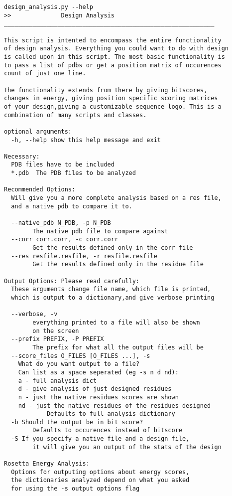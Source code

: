 \begin{lstlisting}[breaklines=true]
design_analysis.py --help
>>              Design Analysis
___________________________________________________________

This script is intented to encompass the entire functionality
of design analysis. Everything you could want to do with design
is called upon in this script. The most basic functionality is
to pass a list of pdbs or get a position matrix of occurences
count of just one line.

The functionality extends from there by giving bitscores,
changes in energy, giving position specific scoring matrices
of your design,giving a customizable sequence logo. This is a
combination of many scripts and classes.

optional arguments:
  -h, --help show this help message and exit

Necessary:
  PDB files have to be included
  *.pdb  The PDB files to be analyzed

Recommended Options:
  Will give you a more complete analysis based on a res file,
  and a native pdb to compare it to.

  --native_pdb N_PDB, -p N_PDB
        The native pdb file to compare against
  --corr corr.corr, -c corr.corr
        Get the results defined only in the corr file
  --res resfile.resfile, -r resfile.resfile
        Get the results defined only in the residue file

Output Options: Please read carefully:
  These arguments change file name, which file is printed,
  which is output to a dictionary,and give verbose printing

  --verbose, -v
        everything printed to a file will also be shown
        on the screen
  --prefix PREFIX, -P PREFIX
        The prefix for what all the output files will be
  --score_files O_FILES [O_FILES ...], -s
    What do you want output to a file?
    Can list as a space seperated (eg -s n d nd):
    a - full analysis dict
    d - give analysis of just designed residues
    n - just the native residues scores are shown
    nd - just the native residues of the residues designed
            Defaults to full analysis dictionary
  -b Should the output be in bit score?
        Defaults to occurences instead of bitscore
  -S If you specify a native file and a design file,
        it will give you an output of the stats of the design

Rosetta Energy Analysis:
  Options for outputing options about energy scores,
  the dictionaries analyzed depend on what you asked
  for using the -s output options flag


\end{lstlisting}
